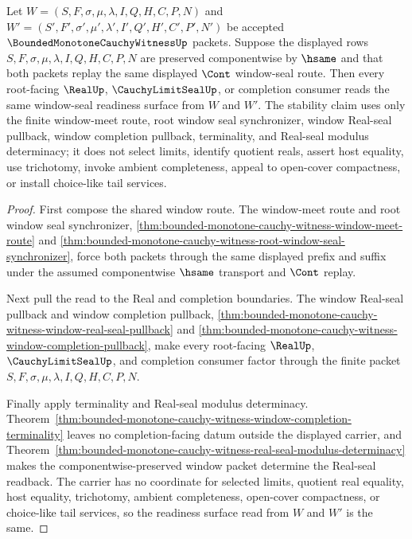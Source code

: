 \begin{theorem}
\label{thm:bounded-monotone-cauchy-witness-window-readback-stability}
Let $W=(S,F,\sigma,\mu,\lambda,I,Q,H,C,P,N)$ and $W'=(S',F',\sigma',\mu',\lambda',I',Q',H',C',P',N')$ be accepted $\BoundedMonotoneCauchyWitnessUp$ packets. Suppose the displayed rows $S,F,\sigma,\mu,\lambda,I,Q,H,C,P,N$ are preserved componentwise by $\hsame$ and that both packets replay the same displayed $\Cont$ window-seal route. Then every root-facing $\RealUp$, $\CauchyLimitSealUp$, or completion consumer reads the same window-seal readiness surface from $W$ and $W'$. The stability claim uses only the finite window-meet route, root window seal synchronizer, window Real-seal pullback, window completion pullback, terminality, and Real-seal modulus determinacy; it does not select limits, identify quotient reals, assert host equality, use trichotomy, invoke ambient completeness, appeal to open-cover compactness, or install choice-like tail services.
\end{theorem}
\begin{proof}
First compose the shared window route. The window-meet route and root window seal synchronizer, \autoref{thm:bounded-monotone-cauchy-witness-window-meet-route} and \autoref{thm:bounded-monotone-cauchy-witness-root-window-seal-synchronizer}, force both packets through the same displayed prefix and suffix under the assumed componentwise $\hsame$ transport and $\Cont$ replay.

Next pull the read to the Real and completion boundaries. The window Real-seal pullback and window completion pullback, \autoref{thm:bounded-monotone-cauchy-witness-window-real-seal-pullback} and \autoref{thm:bounded-monotone-cauchy-witness-window-completion-pullback}, make every root-facing $\RealUp$, $\CauchyLimitSealUp$, and completion consumer factor through the finite packet $S,F,\sigma,\mu,\lambda,I,Q,H,C,P,N$.

Finally apply terminality and Real-seal modulus determinacy. Theorem~\ref{thm:bounded-monotone-cauchy-witness-window-completion-terminality} leaves no completion-facing datum outside the displayed carrier, and Theorem~\ref{thm:bounded-monotone-cauchy-witness-real-seal-modulus-determinacy} makes the componentwise-preserved window packet determine the Real-seal readback. The carrier has no coordinate for selected limits, quotient real equality, host equality, trichotomy, ambient completeness, open-cover compactness, or choice-like tail services, so the readiness surface read from $W$ and $W'$ is the same.
\end{proof}

